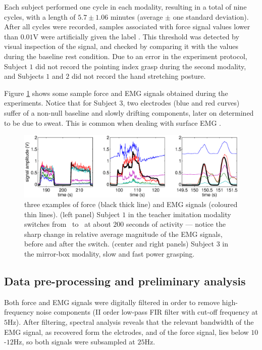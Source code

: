 Each subject performed one cycle in each modality, resulting in a total
of nine cycles, with a length of $5.7 \pm 1.06$ minutes (average
$\pm$ one standard deviation). After all cycles were recorded, samples
associated with force signal values lower than $0.01$V were artificially
given the label \re. This threshold was detected by visual inspection
of the signal, and checked by comparing it with the values during the 
baseline rest condition. Due to an error in the
experiment protocol, Subject $1$ did not record the pointing index
grasp during the second modality, and Subjects $1$ and $2$ did not
record the hand stretching posture.

Figure \ref{fig:examples} shows some sample force and EMG signals obtained
during the experiments. Notice that for Subject $3$, two electrodes (blue and
red curves) suffer of a non-null baseline and slowly drifting components,
later on determined to be due to sweat. This is common when dealing with
surface EMG \cite{deluca97,deluca02}.

\begin{figure}[!ht] \centering
  \includegraphics[width=\textwidth]{figs/figExamples}
  \caption{three examples of force (black thick line) and EMG
    signals (coloured thin lines). (left panel) Subject $1$ in the teacher imitation
    modality switches from \po\ to \pw\ at about $200$ seconds of activity --- notice
    the sharp change in relative average magnitude of the EMG signals, before and after
    the switch. (center and right panels) Subject $3$ in the mirror-box modality, slow
    and fast power grasping.}
  \label{fig:examples}
\end{figure}

\subsection{Data pre-processing and preliminary analysis}

Both force and EMG signals were digitally filtered in order
to remove high-frequency noise components (II order low-pass FIR filter
with cut-off frequency at $5$Hz). After filtering, spectral analysis
reveals that the relevant bandwidth of the
EMG signal, as recovered form the elctrodes, and of the force signal,
lies below $10$-$12$Hz, so both signals were subsampled at $25$Hz.

